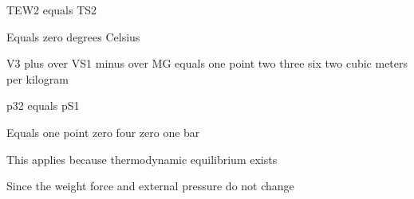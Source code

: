 TEW2 equals TS2  

Equals zero degrees Celsius  

V3 plus over VS1 minus over MG equals one point two three six two cubic meters per kilogram  

p32 equals pS1  

Equals one point zero four zero one bar  

This applies because thermodynamic equilibrium exists  

Since the weight force and external pressure do not change